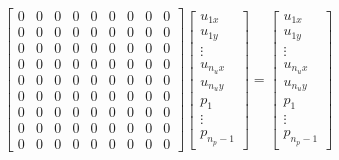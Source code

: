 \begin{align*}
    \begin{bmatrix}
        0 & 0 & 0 & 0 & 0 & 0 & 0 & 0 & 0 \\
        0 & 0 & 0 & 0 & 0 & 0 & 0 & 0 & 0 \\
        0 & 0 & 0 & 0 & 0 & 0 & 0 & 0 & 0 \\
        0 & 0 & 0 & 0 & 0 & 0 & 0 & 0 & 0 \\
        0 & 0 & 0 & 0 & 0 & 0 & 0 & 0 & 0 \\
        0 & 0 & 0 & 0 & 0 & 0 & 0 & 0 & 0 \\
        0 & 0 & 0 & 0 & 0 & 0 & 0 & 0 & 0 \\
        0 & 0 & 0 & 0 & 0 & 0 & 0 & 0 & 0 \\
        0 & 0 & 0 & 0 & 0 & 0 & 0 & 0 & 0
    \end{bmatrix}\begin{bmatrix}
        u_{1x}\\
        u_{1y}\\
        \vdots\\
        u_{n_ux}\\
        u_{n_uy}\\
        p_1\\
        \vdots\\
        p_{n_p - 1}
    \end{bmatrix}
    = \begin{bmatrix}
        u_{1x}\\
        u_{1y}\\
        \vdots\\
        u_{n_ux}\\
        u_{n_uy}\\
        p_1\\
        \vdots\\
        p_{n_p - 1}
    \end{bmatrix}
\end{align*}

